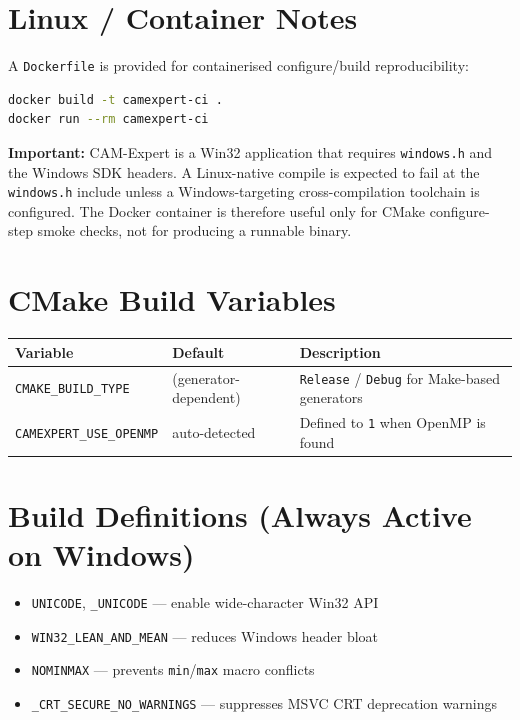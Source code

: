\documentclass[11pt,a4paper]{article}
\begin{document}
\section{Linux / Container Notes}

A \texttt{Dockerfile} is provided for containerised configure/build
reproducibility:

\begin{lstlisting}[language=bash]
docker build -t camexpert-ci .
docker run --rm camexpert-ci
\end{lstlisting}

\noindent \textbf{Important:} CAM-Expert is a Win32 application that requires
\texttt{windows.h} and the Windows SDK headers.  A Linux-native compile is
expected to fail at the \texttt{windows.h} include unless a
Windows-targeting cross-compilation toolchain is configured.  The Docker
container is therefore useful only for CMake configure-step smoke checks,
not for producing a runnable binary.

\section{CMake Build Variables}

\begin{center}
\begin{tabular}{lll}
\hline
\textbf{Variable} & \textbf{Default} & \textbf{Description} \\
\hline
\texttt{CMAKE\_BUILD\_TYPE} & (generator-dependent) & \texttt{Release} / \texttt{Debug} for Make-based generators \\
\texttt{CAMEXPERT\_USE\_OPENMP} & auto-detected & Defined to \texttt{1} when OpenMP is found \\
\hline
\end{tabular}
\end{center}

\section{Build Definitions (Always Active on Windows)}

\begin{itemize}
  \item \texttt{UNICODE}, \texttt{\_UNICODE} --- enable wide-character Win32 API
  \item \texttt{WIN32\_LEAN\_AND\_MEAN} --- reduces Windows header bloat
  \item \texttt{NOMINMAX} --- prevents \texttt{min}/\texttt{max} macro conflicts
  \item \texttt{\_CRT\_SECURE\_NO\_WARNINGS} --- suppresses MSVC CRT deprecation warnings
\end{itemize}
\end{document}
